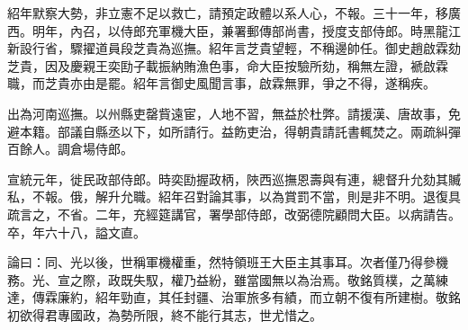 \begin{pinyinscope}
紹年默察大勢，非立憲不足以救亡，請預定政體以系人心，不報。三十一年，移廣西。明年，內召，以侍郎充軍機大臣，兼署郵傳部尚書，授度支部侍郎。時黑龍江新設行省，驟擢道員段芝貴為巡撫。紹年言芝貴望輕，不稱邊帥任。御史趙啟霖劾芝貴，因及慶親王奕劻子載振納賄漁色事，命大臣按驗所劾，稱無左證，褫啟霖職，而芝貴亦由是罷。紹年言御史風聞言事，啟霖無罪，爭之不得，遂稱疾。

出為河南巡撫。以州縣吏罄貲遠宦，人地不習，無益於杜弊。請援漢、唐故事，免避本籍。部議自縣丞以下，如所請行。益飭吏治，得朝貴請託書輒焚之。兩疏糾彈百餘人。調倉場侍郎。

宣統元年，徙民政部侍郎。時奕劻握政柄，陜西巡撫恩壽與有連，總督升允劾其贓私，不報。俄，解升允職。紹年召對論其事，以為賞罰不當，則是非不明。退復具疏言之，不省。二年，充經筵講官，署學部侍郎，改弼德院顧問大臣。以病請告。卒，年六十八，謚文直。

論曰：同、光以後，世稱軍機權重，然特領班王大臣主其事耳。次者僅乃得參機務。光、宣之際，政既失馭，權乃益紛，雖當國無以為治焉。敬銘質樸，之萬練達，傳霖廉約，紹年勁直，其任封疆、治軍旅多有績，而立朝不復有所建樹。敬銘初欲得君專國政，為勢所限，終不能行其志，世尤惜之。


\end{pinyinscope}